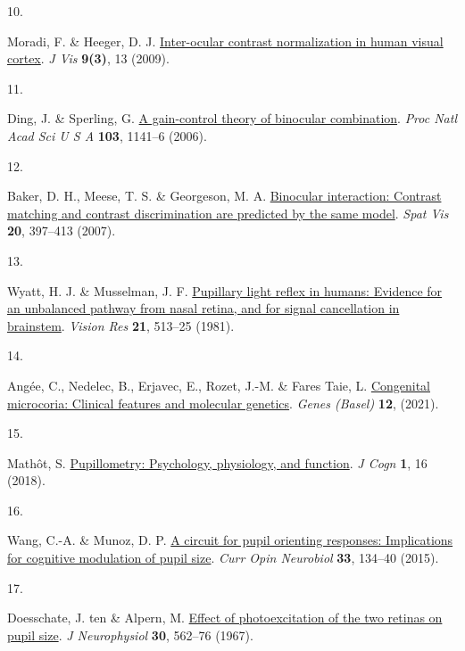 \documentclass[
]{article}
\newlength{\cslhangindent}
\newlength{\csllabelwidth}
\newlength{\cslentryspacingunit} %
\newenvironment{CSLReferences}[2] %
 {%
  \setlength{\parindent}{0pt}
  \ifodd #1
  \let\oldpar\par
  \def\par{\hangindent=\cslhangindent\oldpar}
  \fi
  \setlength{\parskip}{#2\cslentryspacingunit}
 }%
 {}
\newcommand{\CSLLeftMargin}[1]{\parbox[t]{\csllabelwidth}{#1}}
\newcommand{\CSLRightInline}[1]{\parbox[t]{\linewidth - \csllabelwidth}{#1}\break}
\begin{document}
\begin{CSLReferences}{0}{0}
\leavevmode{}%
\CSLLeftMargin{10. }%
\CSLRightInline{Moradi, F. \& Heeger, D. J. \href{https://doi.org/10.1167/9.3.13}{Inter-ocular contrast normalization in human visual cortex}. \emph{J Vis} \textbf{9(3)}, 13 (2009).}

\leavevmode{}%
\CSLLeftMargin{11. }%
\CSLRightInline{Ding, J. \& Sperling, G. \href{https://doi.org/10.1073/pnas.0509629103}{A gain-control theory of binocular combination}. \emph{Proc Natl Acad Sci U S A} \textbf{103}, 1141--6 (2006).}

\leavevmode{}%
\CSLLeftMargin{12. }%
\CSLRightInline{Baker, D. H., Meese, T. S. \& Georgeson, M. A. \href{https://doi.org/10.1163/156856807781503622}{Binocular interaction: Contrast matching and contrast discrimination are predicted by the same model}. \emph{Spat Vis} \textbf{20}, 397--413 (2007).}

\leavevmode{}%
\CSLLeftMargin{13. }%
\CSLRightInline{Wyatt, H. J. \& Musselman, J. F. \href{https://doi.org/10.1016/0042-6989(81)90097-3}{Pupillary light reflex in humans: Evidence for an unbalanced pathway from nasal retina, and for signal cancellation in brainstem}. \emph{Vision Res} \textbf{21}, 513--25 (1981).}

\leavevmode{}%
\CSLLeftMargin{14. }%
\CSLRightInline{Angée, C., Nedelec, B., Erjavec, E., Rozet, J.-M. \& Fares Taie, L. \href{https://doi.org/10.3390/genes12050624}{Congenital microcoria: Clinical features and molecular genetics}. \emph{Genes (Basel)} \textbf{12}, (2021).}

\leavevmode{}%
\CSLLeftMargin{15. }%
\CSLRightInline{Mathôt, S. \href{https://doi.org/10.5334/joc.18}{Pupillometry: Psychology, physiology, and function}. \emph{J Cogn} \textbf{1}, 16 (2018).}

\leavevmode{}%
\CSLLeftMargin{16. }%
\CSLRightInline{Wang, C.-A. \& Munoz, D. P. \href{https://doi.org/10.1016/j.conb.2015.03.018}{A circuit for pupil orienting responses: Implications for cognitive modulation of pupil size}. \emph{Curr Opin Neurobiol} \textbf{33}, 134--40 (2015).}

\leavevmode{}%
\CSLLeftMargin{17. }%
\CSLRightInline{Doesschate, J. ten \& Alpern, M. \href{https://doi.org/10.1152/jn.1967.30.3.562}{Effect of photoexcitation of the two retinas on pupil size}. \emph{J Neurophysiol} \textbf{30}, 562--76 (1967).}


\end{CSLReferences}
\end{document}

